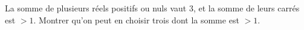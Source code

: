 La somme de plusieurs réels positifs ou nuls vaut $3$, et la somme de leurs carrés est $> 1$. Montrer qu'on peut en choisir trois dont la somme est $> 1$.

